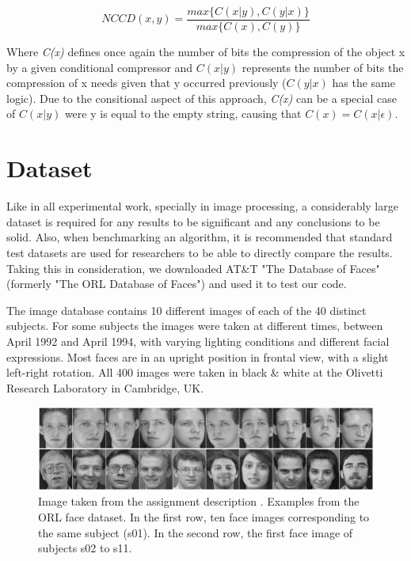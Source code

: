 \documentclass[12pt]{article}
\begin{document}
\begin{equation}\label{eq:3}
  NCCD(x,y) = \frac{max\{C(x|y), C(y|x)\}}{max\{C(x), C(y)\}}
\end{equation}

Where \textit{C(x)} defines once again the number of bits the compression of the object x by a given conditional compressor and $C(x|y)$ represents the number of bits the compression of x needs given that y occurred previously ($C(y|x)$ has the same logic). Due to the consitional aspect of this approach, \textit{C(x)} can be a special case of $C(x|y)$ were y is equal to the empty string, causing that $C(x) = C(x|\epsilon)$.

\newpage
\section{Dataset} %

Like in all experimental work, specially in image processing, a considerably large dataset is required for any results to be significant and any conclusions to be solid.
Also, when benchmarking an algorithm, it is recommended that standard test datasets are used for researchers to be able to directly compare the results. 
Taking this in consideration, we downloaded AT\&T "The Database of Faces" (formerly "The ORL Database of Faces") and used it to test our code.

The image database contains 10 different images of each of the 40 distinct subjects.
For some subjects the images were taken at different times, between April 1992 and April 1994, with varying lighting conditions and different facial expressions.
Most faces are in an upright position in frontal view, with a slight left-right rotation.
All 400 images were taken in black \& white at the Olivetti Research Laboratory in Cambridge, UK.

\begin{figure}[H]
  \centering
  \begin{minipage}{\textwidth}
    \centering
    \includegraphics[width=\linewidth]{faces_example.png}
  \end{minipage}%
  \caption{Image taken from the assignment description \cite{trab3}. Examples from the ORL face dataset. In the first row, ten face images corresponding to the same subject (s01). In the second row, the first face image of subjects s02 to s11.}
  \label{fig:quantization}
\end{figure}
\end{document}
